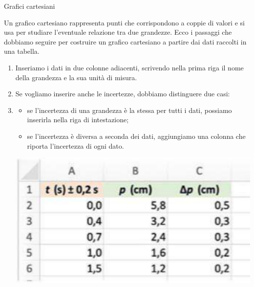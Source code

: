 \documentclass[12pt,a4paper,oneside]{book}
\makeatletter
\newcounter{testexample} %
\renewcommand{\subsubsection}{\@startsection {subsubsection}{3}{\z@}
{-2ex \@plus -0.1ex \@minus -.2ex}
{.2ex \@plus.2ex }
{\color[rgb]{0.141,0.596,0.749}\normalfont\small\sffamily\bfseries}}
\theoremstyle{esercizio}
\makeatother
\begin{document}
\subsubsection{Grafici cartesiani}

Un grafico cartesiano rappresenta punti che corrispondono a coppie di valori e si usa per studiare l'eventuale relazione tra due grandezze.
Ecco i passaggi che dobbiamo seguire per costruire un grafico cartesiano a partire dai dati raccolti in una tabella.
\begin{enumerate}
    \item Inseriamo i dati in due colonne adiacenti, scrivendo nella prima
    riga il nome della grandezza e la sua unità di misura. 
    \item Se vogliamo inserire anche le incertezze, dobbiamo distinguere due casi: 
    \item \begin{itemize}
    \item se l'incertezza di una grandezza è la stessa per tutti i dati, 
    possiamo inserirla nella riga di intestazione;

\item se l'incertezza è diversa a seconda dei dati, aggiungiamo una colonna
che riporta l'incertezza di ogni dato.
    \end{itemize}

    \begin{testexample}

    
        
         \begin{minipage}{\linewidth}
            \centering
            \includegraphics[scale=0.2]{path_to_image/barre-libre.png} 
            \label{fig:barrelibre}\end{minipage}
        \end{testexample}


\end{enumerate}
\end{document}
